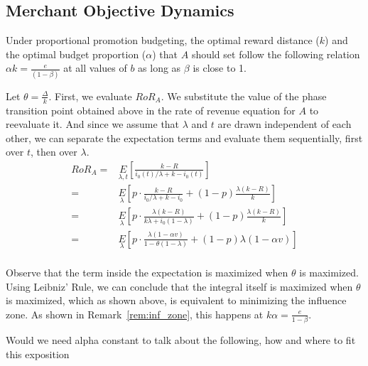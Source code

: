 

\subsection{Merchant Objective Dynamics}

\begin{theorem}
Under proportional promotion budgeting, the optimal reward distance ($k$) and the optimal budget proportion ($\alpha$) that $A$ should set follow the following relation $\alpha k = \frac{e}{(1-\beta)}$ at all values of $b$ as long as $\beta$ is close to 1.
\end{theorem}
\proof
Let $\theta = \frac{\Delta}{k}$. First, we evaluate $RoR_A$.
We substitute the value of the phase transition point obtained above in the rate of revenue equation for $A$ to reevaluate it. 
And since we assume that $\lambda$ and $t$ are drawn independent of each other, we can separate the expectation terms and evaluate them sequentially, first over $t$, then over $\lambda$.
\begin{align*}
RoR_A =& \underset{\lambda, t}E\left[\frac{k-R}{i_0(t)/\lambda + k - i_0(t)}\right]\\
                                       =& \underset{\lambda}E\left[p\cdot\frac{k-R}{i_0/\lambda + k - i_0} + (1-p)\frac{\lambda(k-R)}{k}\right]\\
                                       =& \underset{\lambda}E\left[p\cdot\frac{\lambda(k-R)}{k\lambda + i_0(1-\lambda)} + (1-p)\frac{\lambda(k-R)}{k}\right]\\
                                       =& \underset{\lambda}E\left[p\cdot\frac{\lambda(1-\alpha v)}{1-\theta(1-\lambda)} + (1-p)\lambda (1-\alpha v)\right]\\
\end{align*}

Observe that the term inside the expectation is maximized when $\theta$ is maximized.
Using Leibniz' Rule, we can conclude that the integral itself is maximized when $\theta$ is maximized, which as shown above, is equivalent to minimizing the influence zone.
As shown in Remark~\ref{rem:inf_zone}, this happens at $k \alpha = \frac{e}{1-\beta}$. 
\endproof

{\arpit Would we need alpha constant to talk about the following, how and where to fit this exposition}

